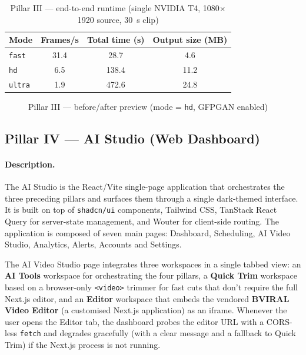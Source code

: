 \begin{table}[H]
\centering
\caption{Pillar III --- end-to-end runtime (single NVIDIA T4, 1080$\times$1920 source, 30~s clip)}
\label{tab:pillar3_runtime}
\small
\begin{tabular}{lccc}
\toprule
Mode  & Frames/s & Total time (s) & Output size (MB) \\
\midrule
\texttt{fast}   & 31.4 & 28.7  & 4.6 \\
\texttt{hd}     & 6.5  & 138.4 & 11.2 \\
\texttt{ultra}  & 1.9  & 472.6 & 24.8 \\
\bottomrule
\end{tabular}
\end{table}

\begin{figure}[H]
\centering
{}
\caption{Pillar III --- before/after preview (mode = \texttt{hd}, GFPGAN enabled)}
\label{fig:enh_preview}
\end{figure}

\subsection{Pillar IV --- AI Studio (Web Dashboard)}
\label{sec:pillar4}

\paragraph{Description.}
The AI Studio is the React/Vite single-page application that orchestrates the three
preceding pillars and surfaces them through a single dark-themed interface. It is built on
top of \texttt{shadcn/ui} components, Tailwind CSS, TanStack React Query for server-state
management, and Wouter for client-side routing. The application is composed of seven main
pages: Dashboard, Scheduling, AI Video Studio, Analytics, Alerts, Accounts and Settings.

The AI Video Studio page integrates three workspaces in a single tabbed view: an
\textbf{AI Tools} workspace for orchestrating the four pillars, a \textbf{Quick Trim}
workspace based on a browser-only \texttt{<video>} trimmer for fast cuts that don't require
the full Next.js editor, and an \textbf{Editor} workspace that embeds the vendored
\textbf{BVIRAL Video Editor} (a customised Next.js application) as an iframe. Whenever the
user opens the Editor tab, the dashboard probes the editor URL with a CORS-less
\texttt{fetch} and degrades gracefully (with a clear message and a fallback to Quick Trim) if
the Next.js process is not running.

